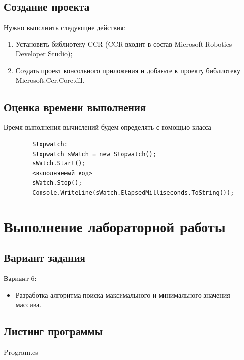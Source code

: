 \documentclass[russian,utf8,pointsection]{eskdtext}
\begin{document}
       \subsection{Создание проекта}
       Нужно выполнить следующие действия:
       \begin{enumerate}
       \item Установить библиотеку CCR (CCR входит в состав Microsoft Robotics Developer Studio);
       \item Создать проект консольного приложения и добавьте к проекту библиотеку Microsoft.Ccr.Core.dll.
       	\end{enumerate}
       	
       	\subsection{Оценка времени выполнения}
       	Время выполнения вычислений будем определять с помощью класса
       	\begin{lstlisting}
       	Stopwatch:       	
       	Stopwatch sWatch = new Stopwatch();       	
       	sWatch.Start();       	
       	<выполняемый код>       	
       	sWatch.Stop();       	
       	Console.WriteLine(sWatch.ElapsedMilliseconds.ToString());
       	      	\end{lstlisting}
       	
       	\section{Выполнение лабораторной работы}
       		\subsection{Вариант задания}
       		Вариант 6:
       		\begin{itemize}
       			\item Разработка алгоритма поиска максимального и минимального значения	массива.
       		\end{itemize}
       	\subsection{Листинг программы}
       
     
  
   {Program.cs}
       	
\end{document}
